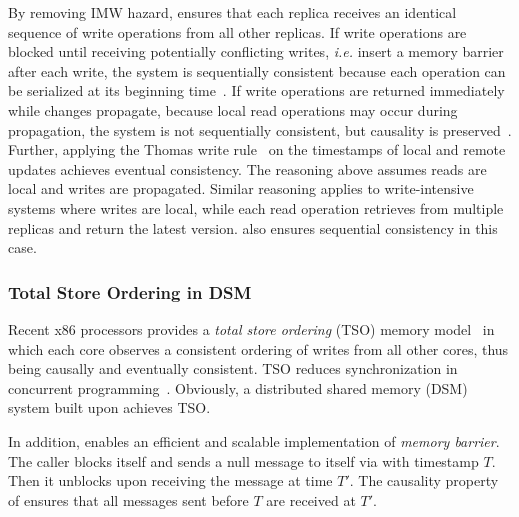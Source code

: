 By removing IMW hazard, \sys ensures that each replica receives an identical sequence of write operations from all other replicas.
If write operations are blocked until receiving potentially conflicting writes, \textit{i.e.} insert a memory barrier after each write, the system is sequentially consistent because each operation can be serialized at its beginning time~\cite{lu2016snow}.
If write operations are returned immediately while changes propagate, because local read operations may occur during propagation, the system is not sequentially consistent, but causality is preserved~\cite{terry1995managing}.
Further, applying the Thomas write rule~\cite{thomas1979majority} on the timestamps of local and remote updates achieves eventual consistency.
The reasoning above assumes reads are local and writes are propagated.
Similar reasoning applies to write-intensive systems where writes are local, while each read operation retrieves from multiple replicas and return the latest version.
\sys also ensures sequential consistency in this case.

\subsubsection{Total Store Ordering in DSM}

Recent x86 processors provides a \textit{total store ordering} (TSO) memory model~\cite{sewell2010x86} in which each core observes a consistent ordering of writes from all other cores, thus being causally and eventually consistent.
TSO reduces synchronization in concurrent programming~\cite{morrison2013fast,tassarotti2015verifying}.
Obviously, a distributed shared memory (DSM) system built upon \sys achieves TSO.

In addition, \sys enables an efficient and scalable implementation of \textit{memory barrier}.
The caller blocks itself and sends a null message to itself via \sys with timestamp $T$. Then it unblocks upon receiving the message at time $T'$.
The causality property of \sys ensures that all messages sent before $T$ are received at $T'$.

